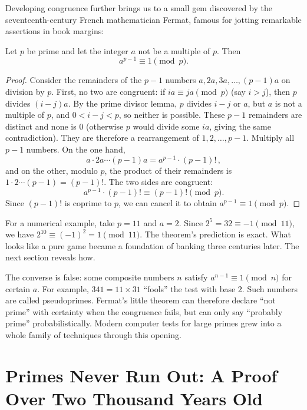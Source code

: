 Developing congruence further brings us to a small gem discovered by the seventeenth-century French mathematician Fermat, famous for jotting remarkable assertions in book margins:

\begin{dingli}
Let $p$ be prime and let the integer $a$ not be a multiple of $p$. Then
\[
a^{p-1}\equiv1\pmod{p}.
\]
\end{dingli}

\begin{proof}
Consider the remainders of the $p-1$ numbers $a,2a,3a,\dots,(p-1)a$ on division by $p$. First, no two are congruent: if $ia\equiv ja\pmod p$ (say $i>j$), then $p$ divides $(i-j)a$. By the prime divisor lemma, $p$ divides $i-j$ or $a$, but $a$ is not a multiple of $p$, and $0<i-j<p$, so neither is possible. These $p-1$ remainders are distinct and none is $0$ (otherwise $p$ would divide some $ia$, giving the same contradiction). They are therefore a rearrangement of $1,2,\dots,p-1$. Multiply all $p-1$ numbers. On the one hand,
\[
a\cdot2a\cdots(p-1)a=a^{p-1}\cdot(p-1)!\,,
\]
and on the other, modulo $p$, the product of their remainders is $1\cdot2\cdots(p-1)=(p-1)!$. The two sides are congruent:
\[
a^{p-1}\cdot(p-1)!\equiv(p-1)!\pmod p.
\]
Since $(p-1)!$ is coprime to $p$, we can cancel it to obtain $a^{p-1}\equiv1\pmod p$.
\end{proof}

For a numerical example, take $p=11$ and $a=2$. Since $2^5=32\equiv-1\pmod{11}$, we have $2^{10}\equiv(-1)^2=1\pmod{11}$. The theorem's prediction is exact. What looks like a pure game became a foundation of banking three centuries later. The next section reveals how.

\begin{zhu}
The converse is false: some composite numbers $n$ satisfy $a^{n-1}\equiv1\pmod n$ for certain $a$. For example, $341=11\times31$ ``fools'' the test with base $2$. Such numbers are called pseudoprimes. Fermat's little theorem can therefore declare ``not prime'' with certainty when the congruence fails, but can only say ``probably prime'' probabilistically. Modern computer tests for large primes grew into a whole family of techniques through this opening.
\end{zhu}

\section{Primes Never Run Out: A Proof Over Two Thousand Years Old}

